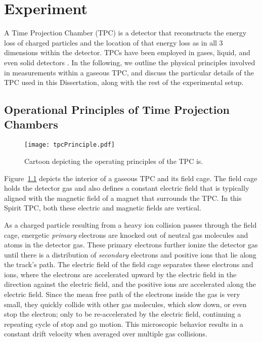 \chapter{Experiment}
\label{chap:experiment}

A Time Projection Chamber (TPC) is a detector that reconstructs the energy loss of charged particles and the location of that energy loss as in all 3 dimensions within the detector. TPCs have been employed in gases, liquid, and even solid detectors \cite{starTPC,arTPC,eosTPC}. In the following, we outline the physical principles involved in measurements within a gaseous TPC, and discuss the particular details of the TPC used in this Dissertation, along with the rest of the experimental setup.


\section{Operational Principles of Time Projection Chambers}

\begin{figure}[!htb]
\centering
\texttt{[image: tpcPrinciple.pdf]}
\caption{Cartoon depicting the operating principles of the TPC is.}
\label{fig:tpcPrinciple}
\end{figure}

Figure~\ref{fig:tpcPrinciple} depicts the interior of a gaseous TPC and its field cage. The field cage holds the detector gas and also defines a constant electric field that is typically aligned with the magnetic field of a magnet that surrounds the TPC. In this Spirit TPC, both these electric and magnetic fields are vertical.  

As a charged particle resulting from a heavy ion collision passes through the field cage, energetic \emph{primary} electrons are knocked out of neutral gas molecules and atoms in the detector gas. These primary electrons further ionize the detector gas until there is a distribution of \emph{secondary} electrons and positive ions that lie along the track's path. The electric field of the field cage separates these electrons and ions, where the electrons are accelerated upward by the electric field in the direction against the electric field, and the positive ions are accelerated along the electric field. Since the mean free path of the electrons inside the gas is very small, they quickly collide with other gas molecules, which slow down, or even stop the electron; only to be re-accelerated by the electric field, continuing a repeating cycle of stop and go motion. This microscopic behavior results in a constant drift velocity when averaged over multiple gas collisions. 

